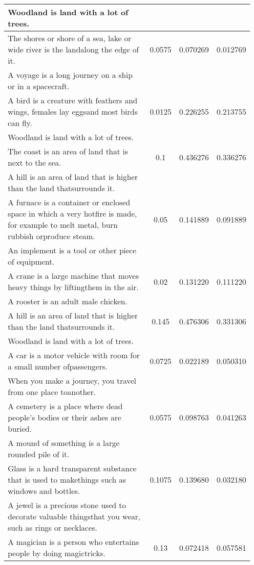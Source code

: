 \begin{table}[p]
\begin{center}
{\begin{tabular}{|p{9cm}|c|c|c|}
Woodland is land with a lot of trees. & & & \\
\hline
The shores or shore of a sea, lake or wide river is the landalong the edge of it. & 0.0575 & 0.070269 & 0.012769 \\
A voyage is a long journey on a ship or in a spacecraft. & & & \\
\hline
A bird is a creature with feathers and wings, females lay eggsand most birds can fly. & 0.0125 & 0.226255 & 0.213755 \\
Woodland is land with a lot of trees. & & & \\
\hline
The coast is an area of land that is next to the sea. & 0.1 & 0.436276 & 0.336276 \\
A hill is an area of land that is higher than the land thatsurrounds it. & & & \\
\hline
A furnace is a container or enclosed space in which a very hotfire is made, for example to melt metal, burn rubbish orproduce steam. & 0.05 & 0.141889 & 0.091889 \\
An implement is a tool or other piece of equipment. & & & \\
\hline
A crane is a large machine that moves heavy things by liftingthem in the air. & 0.02 & 0.131220 & 0.111220 \\
A rooster is an adult male chicken. & & & \\
\hline
A hill is an area of land that is higher than the land thatsurrounds it. & 0.145 & 0.476306 & 0.331306 \\
Woodland is land with a lot of trees. & & & \\
\hline
A car is a motor vehicle with room for a small number ofpassengers. & 0.0725 & 0.022189 & 0.050310 \\
When you make a journey, you travel from one place toanother. & & & \\
\hline
A cemetery is a place where dead people's bodies or their ashes are buried. & 0.0575 & 0.098763 & 0.041263 \\
A mound of something is a large rounded pile of it. & & & \\
\hline
Glass is a hard transparent substance that is used to makethings such as windows and bottles. & 0.1075 & 0.139680 & 0.032180 \\
A jewel is a precious stone used to decorate valuable thingsthat you wear, such as rings or necklaces. & & & \\
\hline
A magician is a person who entertains people by doing magictricks. & 0.13 & 0.072418 & 0.057581 \\

\end{tabular}}
\end{center}
\end{table}
